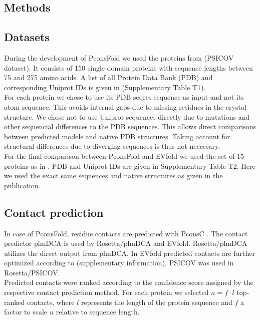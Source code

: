\documentclass{bioinfo}
\begin{document}
\begin{methods}
\section{Methods}

\subsection{Datasets}
During the development of PconsFold we used the proteins from \citeauthor{jones_PSICOV:_2012} \citeyear{jones_PSICOV:_2012} (PSICOV dataset). It consists of 150 single domain proteins with sequence lengths between 75 and 275 amino acids. A list of all Protein Data Bank (PDB) \cite[]{berman_protein_2000} and corresponding Uniprot \cite[]{magrane_uniprot_2011} IDs is given in (Supplementary Table T1). \\\indent
For each protein we chose to use its PDB seqres sequence as input and not its atom sequence. This avoids internal gaps due to missing residues in the crystal structure. We chose not to use Uniprot sequences directly due to mutations and other sequencial differences to the PDB sequences. This allows direct comparisons between predicted models and native PDB structures. Taking account for structural differences due to diverging sequences is thus not neccesary. \\\indent
For the final comparison between PconsFold and EVfold we used the set of 15 proteins as in \citeauthor{marks_protein_2011} \citeyear{marks_protein_2011} . PDB and Uniprot IDs are given in Supplementary Table T2. Here we used the exact same sequences and native structures as given in the publication.

\subsection{Contact prediction}
In case of PconsFold, residue contacts are predicted with PconsC \cite[]{skwark_pconsc:_2013}. The contact predictor plmDCA \cite[]{ekeberg_improved_2013} is used by Rosetta/plmDCA and EVfold. Rosetta/plmDCA utilizes the direct output from plmDCA. In EVfold predicted contacts are further optimized according to \citeauthor{marks_protein_2011} \citeyear{marks_protein_2011} (supplementary information). PSICOV was used in Rosetta/PSICOV. \\\indent  
Predicted contacts were ranked according to the confidence score assigned by the respective contact prediction method. For each protein we selected $n = f \cdot l$ top-ranked contacts, where $l$ represents the length of the protein sequence and $f$ a factor to scale $n$ relative to sequence length. 


\end{methods}
\end{document}
